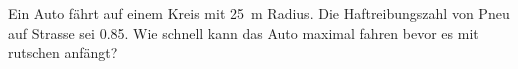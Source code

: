 
\begin{aufgabe}
	Ein Auto fährt auf einem Kreis mit \SI{25}{m} Radius. Die Haftreibungszahl von Pneu auf Strasse sei \num{0.85}.
	Wie schnell kann das Auto maximal fahren bevor es mit rutschen anfängt?
\end{aufgabe}
